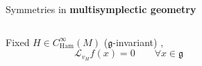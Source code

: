 \documentclass[10pt]{beamer}
\begin{document}
\begin{frame}[t]{Symmetries in \textbf{multisymplectic geometry}}
\begin{columns}[T]
\begin{column}{.50\linewidth}
{\begin{propblock}
                  \small Fixed $H\in C^\infty_{\text{Ham}}(M)$ ($\mathfrak{g}$-invariant) ,
                  $$\mathcal{L}_{v_H} f(x) = 0 \qquad \forall x \in \mathfrak{g}$$
                \end{propblock}
    }
              \end{column}
              \begin{column}{.50\linewidth}
                \centering \it
              \end{column}
            \end{columns}
          \end{frame}
    \note{
    }
    
\end{document}
